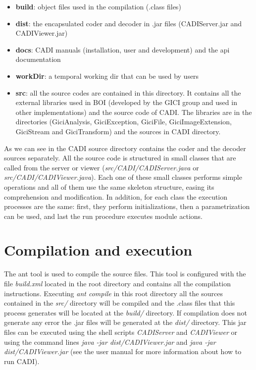 \documentclass[a4paper,10pt]{article}
\begin{document}
	\begin{itemize}
		\item \textbf{build}: object files used in the compilation
		(.class files) 
		\item \textbf{dist}: the encapsulated coder and decoder in .jar
		files (CADIServer.jar and CADIViewer.jar) 
		\item \textbf{docs}: CADI manuals (installation, user and
		development) and the api documentation 
		\item \textbf{workDir}: a temporal working dir that can be used
		by users 
		\item \textbf{src}: all the source codes are contained in this
		directory. It contains all the external libraries used in BOI
		(developed by the GICI group and used in other implementations)
		and the source code of CADI. The libraries are in the directories
		(GiciAnalysis, GiciException, GiciFile, GiciImageExtension,
		GiciStream and GiciTransform) and the sources in CADI directory.  
	\end{itemize}

	As we can see in the CADI source directory contains the
	coder and the decoder sources separately. All the source code is
	structured in small classes that are called from the server or
	viewer (\emph{src/CADI/CADIServer.java} or
	\emph{src/CADI/CADIViewer.java}). Each one of these small
	classes performs simple operations and all of them use the same
	skeleton structure, easing its comprehension and modification. In
	addition, for each class the execution processes are the same:
	first, they perform initializations, then a parametrization can be
	used, and last the run procedure executes module actions.


\section{Compilation and execution}
\label{sect:compilation}

	The ant tool is used to compile the source files. This tool is
	configured with the file \emph{build.xml} located in the root
	directory and contains all the compilation instructions. Executing
	\emph{ant compile} in this root directory all the sources contained
	in the \emph{src/} directory will be compiled and the .class files
	that this process generates will be located at the \emph{build/}
	directory. If compilation does not generate any error the .jar
	files will be generated at the \emph{dist/} directory. This jar
	files can be executed using the shell scripts \emph{CADIServer} and
	\emph{CADIViewer} or using the command lines \emph{java -jar
	dist/CADIViewer.jar} and \emph{java -jar dist/CADIViewer.jar} (see the
	user manual for more information about how to run CADI). 
\end{document}
